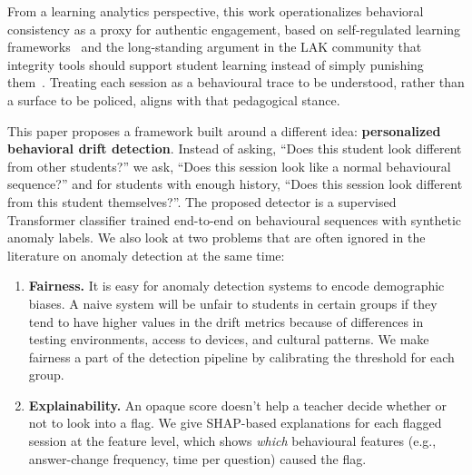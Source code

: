 \documentclass[sigconf]{acmart}
\begin{document}
From a learning analytics perspective, this work operationalizes behavioral consistency as a proxy for authentic engagement, based on self-regulated learning frameworks~\cite{zimmerman2002becoming} and the long-standing argument in the LAK community that integrity tools should support student learning instead of simply punishing them~\cite{baker2010data,khosravi2022explainable}. Treating each session as a behavioural trace to be understood, rather than a surface to be policed, aligns with that pedagogical stance.

This paper proposes a framework built around a different idea: \textbf{personalized behavioral drift detection}. Instead of asking, ``Does this student look different from other students?'' we ask, ``Does this session look like a normal behavioural sequence?'' and for students with enough history, ``Does this session look different from this student themselves?''. The proposed detector is a supervised Transformer classifier trained end-to-end on behavioural sequences with synthetic anomaly labels. We also look at two problems that are often ignored in the literature on anomaly detection at the same time:

\begin{enumerate}
    \item \textbf{Fairness.} It is easy for anomaly detection systems to encode demographic biases. A naive system will be unfair to students in certain groups if they tend to have higher values in the drift metrics because of differences in testing environments, access to devices, and cultural patterns. We make fairness a part of the detection pipeline by calibrating the threshold for each group.
    \item \textbf{Explainability.} An opaque score doesn't help a teacher decide whether or not to look into a flag. We give SHAP-based explanations for each flagged session at the feature level, which shows \textit{which} behavioural features (e.g., answer-change frequency, time per question) caused the flag.
\end{enumerate}
\end{document}

